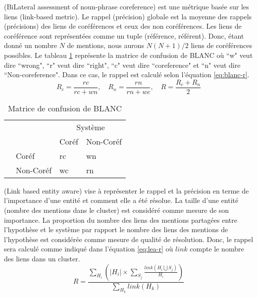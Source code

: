 \documentclass{KodeBook}
\begin{document}
 (BiLateral assessment of noun-phrase coreference) est une métrique basée sur les liens (link-based metric). 
Le rappel (précision) globale est la moyenne des rappels (précisions) des liens de coréférences et ceux des non coréférences. 
Les liens de coréférence sont représentées comme un tuple (référence, référent).
Donc, étant donné un nombre $N$ de mentions, nous aurons $N (N+1)/2$ liens de coréférences possibles. 
Le tableau \ref{tab:blanc-confusion} représente la matrice de confusion de BLANC où ``w" veut dire ``wrong", ``r" veut dire ``right", ``c" veut dire ``coreference" et ``n" veut dire ``Non-coreference".
Dans ce cas, le rappel est calculé selon l'équation \ref{eq:blanc-r}.
\begin{equation}\label{eq:blanc-r}
R_c = \frac{rc}{rc+wn},\quad R_n = \frac{rn}{rn+wc},\quad R = \frac{R_c + R_n}{2}
\end{equation}

\begin{table}[ht]
	\centering 
	\begin{tabular}{llll}
		\cline{3-4}\noalign{\vskip\doublerulesep
			\vskip-\arrayrulewidth}\cline{3-4}
		&& \multicolumn{2}{c}{Système} \\
		\cline{3-4}
	    && Coréf & Non-Coréf  \\
	    \cline{1-2}\noalign{\vskip\doublerulesep
	    	\vskip-\arrayrulewidth}\hline
	    
	\multirow{2}{*}{Hypothèse} & Coréf & rc & wn \\
	                       & Non-Coréf & wc & rn \\
	   \hline\hline
	\end{tabular}
	\caption[Matrice de confusion de BLANC]{Matrice de confusion de BLANC \cite{2011-recasens-hovy}}
	\label{tab:blanc-confusion}
\end{table}

 (Link based entity aware) vise à représenter le rappel et la précision en terme de l'importance d'une entité et comment elle a été résolue. 
La taille d'une entité (nombre des mentions dans le cluster) est considéré comme mesure de son importance. 
La proportion du nombre des liens des mentions partagées entre l'hypothèse et le système par rapport le nombre des liens des mentions de l'hypothèse est considérée comme mesure de qualité de résolution. 
Donc, le rappel sera calculé comme indiqué dans l'équation \ref{eq:lea-r} où $link$ compte le nombre des liens dans un cluster.
\begin{equation}\label{eq:lea-r}
R = \frac{\sum_{H_i} (|H_i| \times \sum_{S_j} \frac{link(H_i \bigcup S_j)}{H_i})}{\sum_{H_k} link(H_k)}
\end{equation}
\end{document}
